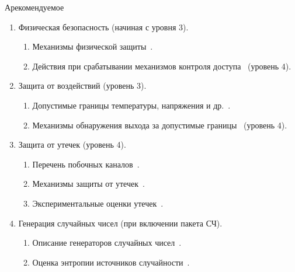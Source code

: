 \begin{appendix}{А}{рекомендуемое}
\begin{enumerate}
\begin{enumerate}
\item
Структура записей аудита~.

\item
Обработка переполнения журнала аудита~.
\end{enumerate}

\item
Физическая безопасность (начиная с уровня 3).

\begin{enumerate}
\item
Механизмы физической защиты~.

\item
Действия при срабатывании механизмов контроля 
доступа~ (уровень 4). 
\end{enumerate}

\item
Защита от воздействий (уровень 3).

\begin{enumerate}
\item
Допустимые границы температуры, напряжения и др.~.

\item
Механизмы обнаружения выхода за допустимые границы~
(уровень 4).
\end{enumerate}

\item
Защита от утечек (уровень 4).

\begin{enumerate}
\item
Перечень побочных каналов~.

\item
Механизмы защиты от утечек~.

\item
Экспериментальные оценки утечек~.
\end{enumerate}

\item
Генерация случайных чисел (при включении пакета СЧ).

\begin{enumerate}
\item
Описание генераторов случайных чисел~.

\item
Оценка энтропии источников случайности~.


\end{enumerate}
\end{enumerate}
\end{appendix}
